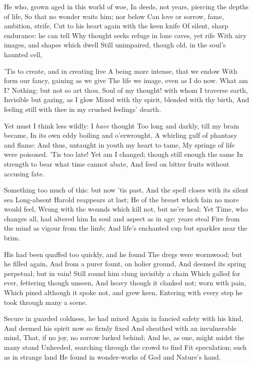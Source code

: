\documentclass[10pt,twocolumn]{book}
\begin{document}
   He who, grown aged in this world of woe,
   In deeds, not years, piercing the depths of life,
   So that no wonder waits him; nor below
   Can love or sorrow, fame, ambition, strife,
   Cut to his heart again with the keen knife
   Of silent, sharp endurance:  he can tell
   Why thought seeks refuge in lone caves, yet rife
   With airy images, and shapes which dwell
Still unimpaired, though old, in the soul's haunted cell,

   'Tis to create, and in creating live
   A being more intense, that we endow
   With form our fancy, gaining as we give
   The life we image, even as I do now.
   What am I?  Nothing:  but not so art thou,
   Soul of my thought! with whom I traverse earth,
   Invisible but gazing, as I glow
   Mixed with thy spirit, blended with thy birth,
And feeling still with thee in my crushed feelings' dearth.


   Yet must I think less wildly:  I \textit{have} thought
   Too long and darkly, till my brain became,
   In its own eddy boiling and o'erwrought,
   A whirling gulf of phantasy and flame:
   And thus, untaught in youth my heart to tame,
   My springs of life were poisoned.  'Tis too late!
   Yet am I changed; though still enough the same
   In strength to bear what time cannot abate,
And feed on bitter fruits without accusing fate.


   Something too much of this:  but now 'tis past,
   And the spell closes with its silent sea
   Long-absent Harold reappears at last;
   He of the breast which fain no more would feel,
   Wrung with the wounds which kill not, but ne'er heal;
   Yet Time, who changes all, had altered him
   In soul and aspect as in age:  years steal
   Fire from the mind as vigour from the limb;
And life's enchanted cup but sparkles near the brim.


   His had been quaffed too quickly, and he found
   The dregs were wormwood; but he filled again,
   And from a purer fount, on holier ground,
   And deemed its spring perpetual; but in vain!
   Still round him clung invisibly a chain
   Which galled for ever, fettering though unseen,
   And heavy though it clanked not; worn with pain,
   Which pined although it spoke not, and grew keen,
Entering with every step he took through many a scene.


   Secure in guarded coldness, he had mixed
   Again in fancied safety with his kind,
   And deemed his spirit now so firmly fixed
   And sheathed with an invulnerable mind,
   That, if no joy, no sorrow lurked behind;
   And he, as one, might midst the many stand
   Unheeded, searching through the crowd to find
   Fit speculation; such as in strange land
He found in wonder-works of God and Nature's hand.
\end{document}

